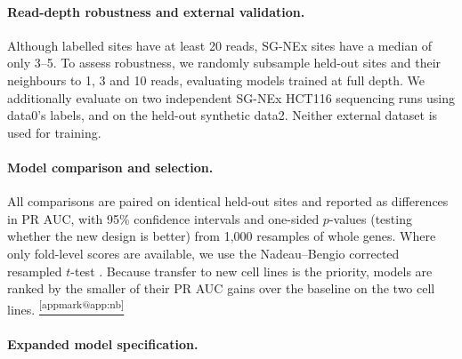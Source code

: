 \documentclass[11pt,a4paper]{article}
\makeatletter
\DeclareRobustCommand{\applink}[1]{%
    \hyperref[#1]{\textsuperscript{\ref*{appmark@#1}}}}
\makeatother
\begin{document}
\paragraph{Read-depth robustness and external validation.}
Although labelled sites have at least 20 reads, SG-NEx sites have a median of only 3--5. To assess robustness, we randomly subsample held-out sites and their neighbours to 1, 3 and 10 reads, evaluating models trained at full depth. We additionally evaluate on two independent SG-NEx HCT116 sequencing runs using data0's labels, and on the held-out synthetic data2. Neither external dataset is used for training.

\paragraph{Model comparison and selection.}
All comparisons are paired on identical held-out sites and reported as differences in PR AUC, with 95\% confidence intervals and one-sided $p$-values (testing whether the new design is better) from 1,000 resamples of whole genes. Where only fold-level scores are available, we use the Nadeau--Bengio corrected resampled $t$-test \citep{nadeau2003}. Because transfer to new cell lines is the priority, models are ranked by the smaller of their PR AUC gains over the baseline on the two cell lines.\applink{app:nb}

\paragraph{Expanded model specification.}
\end{document}
